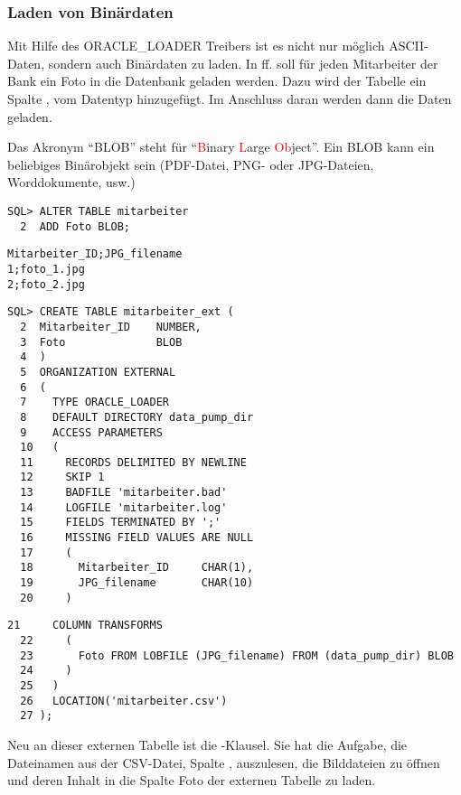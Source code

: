         \subsubsection{Laden von Bin\"ardaten}
          Mit Hilfe des ORACLE\_LOADER Treibers ist es nicht nur m\"oglich ASCII-Daten, sondern auch Bin\"ardaten zu laden. In  ff. soll f\"ur jeden Mitarbeiter der Bank ein Foto in die Datenbank geladen werden. Dazu wird der Tabelle  ein Spalte , vom Datentyp  hinzugef\"ugt. Im Anschluss daran werden dann die Daten geladen.
          \begin{merke}
            Das Akronym \enquote{BLOB} steht f\"ur \enquote{\textcolor{red}{B}inary \textcolor{red}{L}arge \textcolor{red}{Ob}ject}. Ein BLOB kann ein beliebiges Bin\"arobjekt sein (PDF-Datei, PNG- oder JPG-Dateien, Worddokumente, usw.)
          \end{merke}

          \begin{lstlisting}[caption={Anf\"ugen einer BLOB-Spalte},label=admin930,language=oracle_sql]
SQL> ALTER TABLE mitarbeiter
  2  ADD Foto BLOB;

          \end{lstlisting}
          \begin{lstlisting}[caption={Die Datei mitarbeiter.csv},label=admin931,language=terminal]
Mitarbeiter_ID;JPG_filename
1;foto_1.jpg
2;foto_2.jpg
          \end{lstlisting}
          \begin{lstlisting}[caption={Erstellen der externen Tabelle \identifier{mitarbeiter\_ext}}, label=admin932, language=oracle_sql]
SQL> CREATE TABLE mitarbeiter_ext (
  2  Mitarbeiter_ID    NUMBER,
  3  Foto              BLOB
  4  )
  5  ORGANIZATION EXTERNAL
  6  (
  7    TYPE ORACLE_LOADER
  8    DEFAULT DIRECTORY data_pump_dir
  9    ACCESS PARAMETERS
  10   (
  11     RECORDS DELIMITED BY NEWLINE
  12     SKIP 1
  13     BADFILE 'mitarbeiter.bad'
  14     LOGFILE 'mitarbeiter.log'
  15     FIELDS TERMINATED BY ';'
  16     MISSING FIELD VALUES ARE NULL
  17     (
  18       Mitarbeiter_ID     CHAR(1),
  19       JPG_filename       CHAR(10)
  20     )
          \end{lstlisting}
\clearpage
          \begin{lstlisting}[caption={Erstellen der externen Tabelle \identifier{mitarbeiter\_ext} - Fortsetzung}, language=oracle_sql]
  21     COLUMN TRANSFORMS
  22     (
  23       Foto FROM LOBFILE (JPG_filename) FROM (data_pump_dir) BLOB
  24     )
  25   )
  26   LOCATION('mitarbeiter.csv')
  27 );
          \end{lstlisting}
          Neu an dieser externen Tabelle ist die -Klausel. Sie hat die Aufgabe, die Dateinamen aus der CSV-Datei, Spalte , auszulesen, die Bilddateien zu \"offnen und deren Inhalt in die Spalte Foto der externen Tabelle zu laden.
